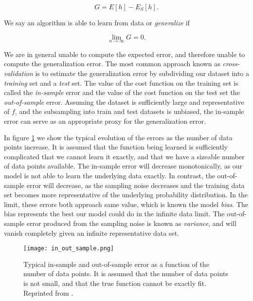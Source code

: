 \begin{equation}
 G = E[h] - E_S[h] .
\end{equation}

We say an algorithm is able to learn from data or \textit{generalize} if 

\begin{equation}
 \lim_{n\to\infty} G = 0 .
\end{equation}

We are in general unable to compute the expected error, and therefore unable
to compute the generalization error. The most common approach known as
\textit{cross-validation} is to estimate the
generalization error by subdividing our dataset into a \textit{training} set
and a \textit{test} set. The value of the cost function on the training set
is called the \textit{in-sample} error and the value of the cost
function on the test set the \textit{out-of-sample} error.
Assuming the dataset is sufficiently large and representative of $f$, and the subsampling
into train and test datasets is unbiased, the in-sample error
can serve as an appropriate proxy for the generalization error.
\par
In figure \ref{fig:in-out}
we show the typical evolution of the errors as the number of data points increase.
It is assumed that the function being learned is sufficiently complicated
that we cannot learn it exactly, and that we have a sizeable number of data points
available. The in-sample error will decrease monotonically, as our model
is not able to learn the underlying data exactly. In contrast, the out-of-sample
error will decrease, as the sampling noise decreases and the training
data set becomes more representative of the underlying probability distribution.
In the limit, these errors both approach same value, which is known the model
\textit{bias}. The bias represents the best our model could do in the infinite data limit.
The out-of-sample error produced from the sampling noise
is known as \textit{variance}, and will vanish completely
given an infinite representative data set.

\begin{figure}[h]
    \centering
    \texttt{[image: in\_out\_sample.png]}
    \caption{Typical in-sample and out-of-sample error as a function
    of the number of data points. It is assumed that the number
    of data points is not small, and that the true function
    cannot be exactly fit. Reprinted from \parencite[Mehta et al. page 11]{
        mehta2019high}.}
    \label{fig:in-out}
\end{figure}

